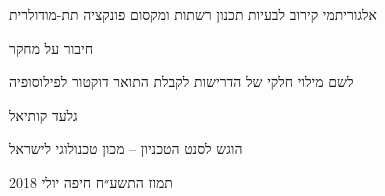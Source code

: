 \begin{hebrew}
\begin{center}

{\Huge אלגוריתמי קירוב לבעיות תכנון רשתות ומקסום פונקציה תת-מודולרית}


{\Large חיבור על מחקר}


\parbox{30em}{
\begin{center}
לשם מילוי חלקי של הדרישות לקבלת התואר
דוקטור לפילוסופיה
\end{center}
}


{\huge גלעד קותיאל}


הוגש לסנט הטכניון – מכון טכנולוגי לישראל

תמוז התשע״ח חיפה יולי 2018
\end{center}
\end{hebrew}
